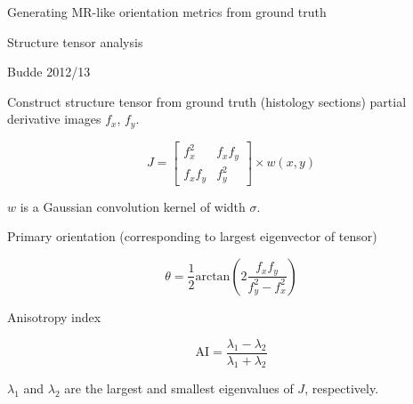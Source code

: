 \documentclass[presentation, 10pt]{beamer}
\begin{document}
\begin{frame}
  \centering
  \Large Generating MR-like orientation metrics from ground truth\newline

  Structure tensor analysis
\end{frame}


\begin{frame}{Budde 2012/13 \cite{budde2012, budde2013}}
  \begin{outline}
    \1 Construct structure tensor from ground truth (histology sections) partial derivative images $f_x$, $f_y$. 

    \begin{equation}
      J = \begin{bmatrix}
        f_x^2 & f_x f_y \\
        f_x f_y & f_y^2
      \end{bmatrix} \times w(x,y)
    \end{equation}

    \2 $w$ is a Gaussian convolution kernel of width $\sigma$.

    \1 Primary orientation (corresponding to largest eigenvector of tensor)

    \begin{equation}
      \theta = \frac{1}{2}\text{arctan}\left(2\frac{f_x f_y}{f_y^2 - f_x^2}\right)
    \end{equation}

    \1 Anisotropy index
    
    \begin{equation}
      \text{AI} = \frac{\lambda_1 - \lambda_2}{\lambda_1 + \lambda_2}
    \end{equation}

    \2 $\lambda_1$ and $\lambda_2$ are the largest and smallest eigenvalues of $J$, respectively.
    
  \end{outline}
\end{frame}
\end{document}
